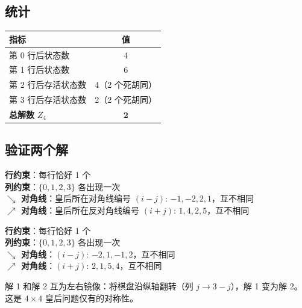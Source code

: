\documentclass[12pt,a4paper]{article}
\begin{document}
\subsection{统计}

\begin{center}
\renewcommand{\arraystretch}{1.3}
\begin{tabular}{l|c}
\toprule
\textbf{指标} & \textbf{值} \\
\midrule
第 0 行后状态数 & 4 \\
第 1 行后状态数 & 6 \\
第 2 行后存活状态数 & 4（2 个死胡同） \\
第 3 行后存活状态数 & 2（2 个死胡同） \\
\midrule
\textbf{总解数} $Z_4$ & $\boldsymbol{2}$ \\
\bottomrule
\end{tabular}
\end{center}

\subsection{验证两个解}

\begin{sumbox}[解 1 验证：行0:列1, 行1:列3, 行2:列0, 行3:列2]
\textbf{行约束}：每行恰好 1 个 \checkmark \\
\textbf{列约束}：$\{0,1,2,3\}$ 各出现一次 \checkmark \\
\textbf{$\searrow$ 对角线}：皇后所在对角线编号 $(i\!-\!j)$: $-1, -2, 2, 1$，互不相同 \checkmark \\
\textbf{$\nearrow$ 对角线}：皇后所在反对角线编号 $(i\!+\!j)$: $1, 4, 2, 5$，互不相同 \checkmark
\end{sumbox}

\begin{sumbox}[解 2 验证：行0:列2, 行1:列0, 行2:列3, 行3:列1]
\textbf{行约束}：每行恰好 1 个 \checkmark \\
\textbf{列约束}：$\{0,1,2,3\}$ 各出现一次 \checkmark \\
\textbf{$\searrow$ 对角线}：$(i\!-\!j)$: $-2, 1, -1, 2$，互不相同 \checkmark \\
\textbf{$\nearrow$ 对角线}：$(i\!+\!j)$: $2, 1, 5, 4$，互不相同 \checkmark
\end{sumbox}

\begin{notebox}[对称性]
解 1 和解 2 互为左右镜像：将棋盘沿纵轴翻转（列 $j \to 3-j$），解 1 变为解 2。
这是 $4\times 4$ 皇后问题仅有的对称性。
\end{notebox}
\end{document}
